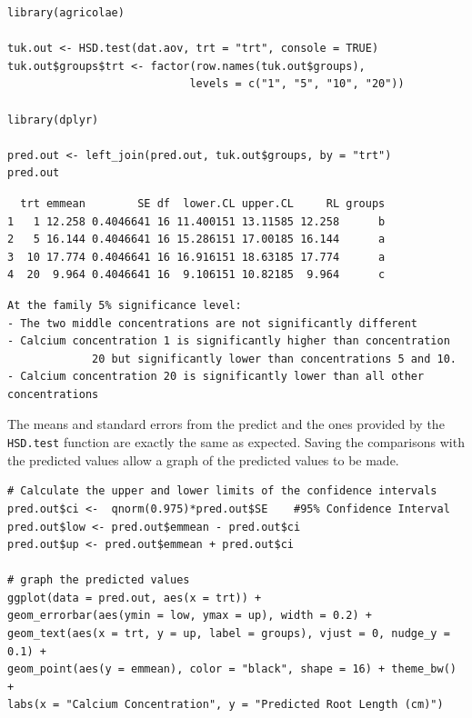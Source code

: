 \documentclass[a4paper, 10pt, fleqn, twosided]{memoir}
\begin{document}
\begin{tcolorbox}[title = Example 1 Tukey's multiple comparison]
\begin{verbatim}
library(agricolae)

tuk.out <- HSD.test(dat.aov, trt = "trt", console = TRUE)
tuk.out$groups$trt <- factor(row.names(tuk.out$groups),
                            levels = c("1", "5", "10", "20"))

library(dplyr)

pred.out <- left_join(pred.out, tuk.out$groups, by = "trt")
pred.out
\end{verbatim}
\end{tcolorbox}
\clearpage


\begin{tcolorbox}[title = Example 1 Tukey's multiple comparison output]
\begin{verbatim}
  trt emmean        SE df  lower.CL upper.CL     RL groups
1   1 12.258 0.4046641 16 11.400151 13.11585 12.258      b
2   5 16.144 0.4046641 16 15.286151 17.00185 16.144      a
3  10 17.774 0.4046641 16 16.916151 18.63185 17.774      a
4  20  9.964 0.4046641 16  9.106151 10.82185  9.964      c
\end{verbatim}
\end{tcolorbox}

\begin{tcolorbox}[title = Example 1 Prediction interpretation]
\begin{verbatim}
At the family 5% significance level:
- The two middle concentrations are not significantly different
- Calcium concentration 1 is significantly higher than concentration
             20 but significantly lower than concentrations 5 and 10.
- Calcium concentration 20 is significantly lower than all other concentrations
\end{verbatim}
\end{tcolorbox}

The means and standard errors from the predict and the ones provided by the \texttt{HSD.test} function are exactly the
same as expected. Saving the comparisons with the predicted values allow a graph of the predicted values to be made.

\begin{tcolorbox}[title = Example 1 Graph of predicted values]
\begin{verbatim}
# Calculate the upper and lower limits of the confidence intervals
pred.out$ci <-  qnorm(0.975)*pred.out$SE    #95% Confidence Interval
pred.out$low <- pred.out$emmean - pred.out$ci
pred.out$up <- pred.out$emmean + pred.out$ci

# graph the predicted values 
ggplot(data = pred.out, aes(x = trt)) +
geom_errorbar(aes(ymin = low, ymax = up), width = 0.2) +
geom_text(aes(x = trt, y = up, label = groups), vjust = 0, nudge_y = 0.1) +
geom_point(aes(y = emmean), color = "black", shape = 16) + theme_bw() +
labs(x = "Calcium Concentration", y = "Predicted Root Length (cm)")
\end{verbatim}
\end{tcolorbox}
\end{document}
